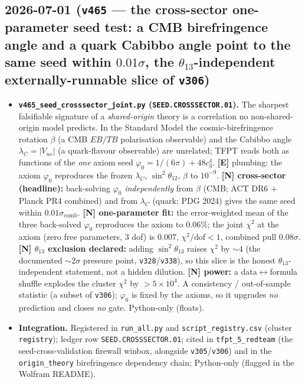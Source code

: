 \documentclass[11pt]{article}
\begin{document}
\subsection*{2026-07-01 (\texttt{v465} --- the cross-sector one-parameter seed test: a CMB birefringence angle and a quark Cabibbo angle point to the same seed within $0.01\sigma$, the $\theta_{13}$-independent externally-runnable slice of \texttt{v306})}
\begin{itemize}
\item \textbf{\texttt{v465\_seed\_crosssector\_joint.py} (\texttt{SEED.CROSSSECTOR.01}).} The sharpest
falsifiable signature of a \emph{shared-origin} theory is a correlation no non-shared-origin model
predicts. In the Standard Model the cosmic-birefringence rotation $\beta$ (a CMB $EB/TB$ polarisation
observable) and the Cabibbo angle $\lambda_C{=}|V_{us}|$ (a quark-flavour observable) are unrelated;
TFPT reads both as functions of the \emph{one} axiom seed $\varphi_0{=}1/(6\pi){+}48c_3^4$.
\textbf{[E]} plumbing: the axiom $\varphi_0$ reproduces the frozen $\lambda_C$, $\sin^2\theta_{12}$,
$\beta$ to $10^{-9}$. \textbf{[N] cross-sector (headline):} back-solving $\varphi_0$ \emph{independently}
from $\beta$ (CMB; ACT DR6 $+$ Planck PR4 combined) and from $\lambda_C$ (quark; PDG 2024) gives the
same seed within $0.01\sigma_{\mathrm{comb}}$. \textbf{[N] one-parameter fit:} the error-weighted mean
of the three back-solved $\varphi_0$ reproduces the axiom to $0.06\%$; the joint $\chi^2$ at the axiom
(zero free parameters, $3$ dof) is $0.007$, $\chi^2/\mathrm{dof}{<}1$, combined pull $0.08\sigma$.
\textbf{[N] $\theta_{13}$ exclusion declared:} adding $\sin^2\theta_{13}$ raises $\chi^2$ by ${\sim}4$
(the documented ${\sim}2\sigma$ pressure point, \texttt{v328}/\texttt{v338}), so this slice is the honest
$\theta_{13}$-independent statement, not a hidden dilution. \textbf{[N] power:} a data$\leftrightarrow$formula
shuffle explodes the cluster $\chi^2$ by ${>}5{\times}10^4$. A consistency / out-of-sample statistic
(a subset of \texttt{v306}); $\varphi_0$ is fixed by the axioms, so it upgrades \emph{no} prediction and
closes \emph{no} gate. Python-only (floats).
\item \textbf{Integration.} Registered in \texttt{run\_all.py} and \texttt{script\_registry.csv}
(cluster \texttt{registry}); ledger row \texttt{SEED.CROSSSECTOR.01}; cited in \texttt{tfpt\_5\_redteam}
(the seed-cross-validation firewall winbox, alongside \texttt{v305}/\texttt{v306}) and in the
\texttt{origin\_theory} birefringence dependency chain; Python-only (flagged in the Wolfram README).
\end{itemize}
\end{document}
